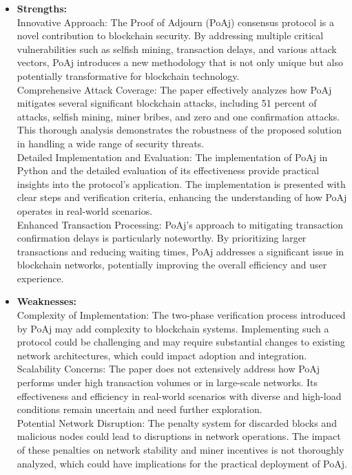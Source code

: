 \documentclass[12pt,a4paper]{article}
\begin{document}
\begin{itemize}
    \begin{itemize}
        \item \textbf{Strengths:} 
        \\ 
Innovative Approach:
The Proof of Adjourn (PoAj) consensus protocol is a novel contribution to blockchain security. By addressing multiple critical vulnerabilities such as selfish mining, transaction delays, and various attack vectors, PoAj introduces a new methodology that is not only unique but also potentially transformative for blockchain technology.
\\
Comprehensive Attack Coverage: The paper effectively analyzes how PoAj mitigates several significant blockchain attacks, including 51 percent of attacks, selfish mining, miner bribes, and zero and one confirmation attacks. This thorough analysis demonstrates the robustness of the proposed solution in handling a wide range of security threats.
\\
Detailed Implementation and Evaluation:
The implementation of PoAj in Python and the detailed evaluation of its effectiveness provide practical insights into the protocol's application. The implementation is presented with clear steps and verification criteria, enhancing the understanding of how PoAj operates in real-world scenarios.
\\
Enhanced Transaction Processing: PoAj's approach to mitigating transaction confirmation delays is particularly noteworthy. By prioritizing larger transactions and reducing waiting times, PoAj addresses a significant issue in blockchain networks, potentially improving the overall efficiency and user experience.
        \item \textbf{Weaknesses:} \\
Complexity of Implementation: The two-phase verification process introduced by PoAj may add complexity to blockchain systems. Implementing such a protocol could be challenging and may require substantial changes to existing network architectures, which could impact adoption and integration.
\\
Scalability Concerns: The paper does not extensively address how PoAj performs under high transaction volumes or in large-scale networks. Its effectiveness and efficiency in real-world scenarios with diverse and high-load conditions remain uncertain and need further exploration.
\\
Potential Network Disruption: The penalty system for discarded blocks and malicious nodes could lead to disruptions in network operations. The impact of these penalties on network stability and miner incentives is not thoroughly analyzed, which could have implications for the practical deployment of PoAj.

\end{itemize}
\end{itemize}
\end{document}
